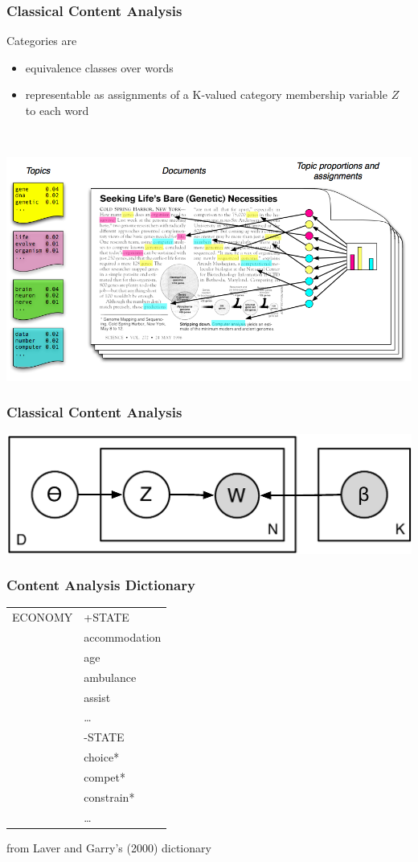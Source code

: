 \documentclass[11pt,compress,professionalfonts]{beamer}
\newcommand{\ita}{\begin{itemize}}
\newcommand{\itm}{\item[]}
\newcommand{\itz}{\end{itemize}}
\begin{document}
\begin{frame}[t]\frametitle{Classical Content Analysis}

Categories are
\ita
\itm equivalence classes over words
\itm representable as assignments of a K-valued category membership variable $Z$ to each word
\itz

~\\
\centerline{\includegraphics[scale=.6]{pictures/topics2}}


\end{frame}
\begin{frame}[t]\frametitle{Classical Content Analysis}

\centerline{\includegraphics[scale=.9]{pictures/new-topics-ca}}

\end{frame}
\begin{frame}[t]\frametitle{Content Analysis Dictionary}

\small

\begin{tabular}{ll}
ECONOMY & +STATE\\
& accommodation\\
& age\\
& ambulance\\
& assist\\
& \ldots\\
& -STATE\\
& choice*\\
& compet*\\
& constrain*\\
& \ldots
\end{tabular}
\normalsize

from Laver and Garry's (2000) dictionary

\end{frame}
\end{document}
